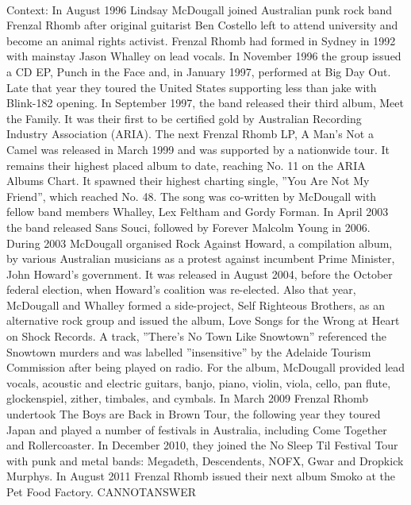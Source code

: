 \documentclass[11pt,a4paper, onecolumn]{article}
\begin{document}
\\ Context: In August 1996 Lindsay McDougall joined Australian punk rock band Frenzal Rhomb after original guitarist Ben Costello left to attend university and become an animal rights activist. Frenzal Rhomb had formed in Sydney in 1992 with mainstay Jason Whalley on lead vocals. In November 1996 the group issued a CD EP, Punch in the Face and, in January 1997, performed at Big Day Out. Late that year they toured the United States supporting less than jake with Blink-182 opening. In September 1997, the band released their third album, Meet the Family. It was their first to be certified gold by Australian Recording Industry Association (ARIA). The next Frenzal Rhomb LP, A Man's Not a Camel was released in March 1999 and was supported by a nationwide tour. It remains their highest placed album to date, reaching No. 11 on the ARIA Albums Chart. It spawned their highest charting single, ''You Are Not My Friend'', which reached No. 48. The song was co-written by McDougall with fellow band members Whalley, Lex Feltham and Gordy Forman. In April 2003 the band released Sans Souci, followed by Forever Malcolm Young in 2006. During 2003 McDougall organised Rock Against Howard, a compilation album, by various Australian musicians as a protest against incumbent Prime Minister, John Howard's government. It was released in August 2004, before the October federal election, when Howard's coalition was re-elected. Also that year, McDougall and Whalley formed a side-project, Self Righteous Brothers, as an alternative rock group and issued the album, Love Songs for the Wrong at Heart on Shock Records. A track, ''There's No Town Like Snowtown'' referenced the Snowtown murders and was labelled ''insensitive'' by the Adelaide Tourism Commission after being played on radio. For the album, McDougall provided lead vocals, acoustic and electric guitars, banjo, piano, violin, viola, cello, pan flute, glockenspiel, zither, timbales, and cymbals. In March 2009 Frenzal Rhomb undertook The Boys are Back in Brown Tour, the following year they toured Japan and played a number of festivals in Australia, including Come Together and Rollercoaster. In December 2010, they joined the No Sleep Til Festival Tour with punk and metal bands: Megadeth, Descendents, NOFX, Gwar and Dropkick Murphys. In August 2011 Frenzal Rhomb issued their next album Smoko at the Pet Food Factory. CANNOTANSWER
\end{document}
